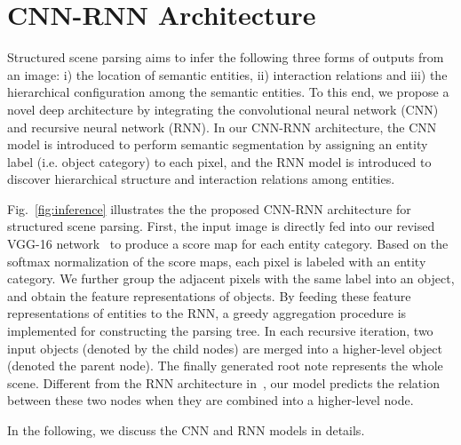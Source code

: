 \documentclass[10pt,twocolumn,letterpaper]{article}
\begin{document}


\section{CNN-RNN Architecture}
\label{CNN-RNN Architecture}

Structured scene parsing aims to infer the following three forms of outputs from an image: i) the location of semantic entities, ii) interaction relations and iii) the hierarchical configuration among the semantic entities. To this end, we propose a novel deep architecture by integrating the convolutional neural network (CNN) and recursive neural network (RNN). In our CNN-RNN architecture, the CNN model is introduced to perform semantic segmentation by assigning an entity label (i.e. object category) to each pixel, and the RNN model is introduced to discover hierarchical structure and interaction relations among entities.

Fig.~\ref{fig:inference} illustrates the the proposed CNN-RNN architecture for structured scene parsing. First, the input image is directly fed into our revised VGG-16 network~\cite{vggnet} to produce a score map for each entity category. Based on the softmax normalization of the score maps, each pixel is labeled with an entity category. We further group the adjacent pixels with the same label into an object, and obtain the feature representations of objects. By feeding these feature representations of entities to the RNN, a greedy aggregation procedure is implemented for  constructing the parsing tree. In each recursive iteration, two input objects (denoted by the child nodes) are merged into a higher-level object (denoted the parent node). The finally generated root note represents the whole scene. Different from the RNN architecture in~\cite{DBLP:Recursive_Socher}\cite{DBLP:RecursiveContext2}, our model predicts the relation between these two nodes when they are combined into a higher-level node.

In the following, we discuss the CNN and RNN models in details.




\end{document}
